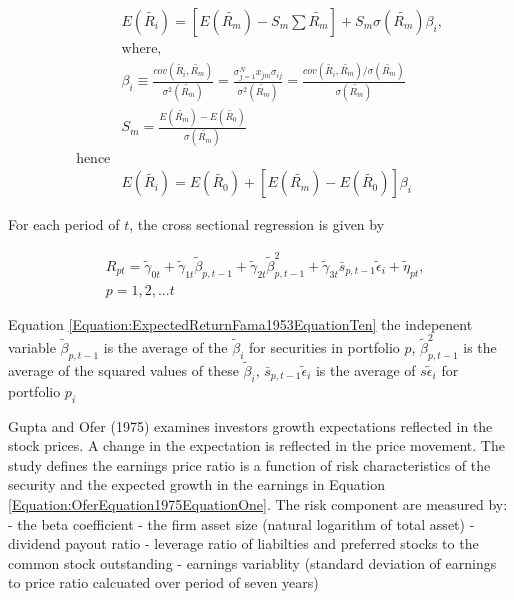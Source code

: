 \documentclass[
  letterpaper,
  DIV=11,
  numbers=noendperiod]{scrreprt}
\begin{document}
\begin{align}
    &E(\tilde{R_i}) = \left[E(\tilde{R_m}) -S_m \sum\tilde{R_m}  \right] + S_m \sigma (\tilde{R_m}) \beta_i, \nonumber \\
    &\text{where}, \nonumber \\ 
    &\beta_i \equiv \frac{cov(\tilde{R_i}, \tilde{R_m})}{\sigma^2(\tilde{R_m})} = \frac{\sigma_{j=1}^{N} x_{jm}\sigma_{ij}}{\sigma^2 (\tilde{R_m})}=\frac{cov(\tilde{R_i},\tilde{R_m})/\sigma(\tilde{R_m})}{\sigma (\tilde{R_m})} \nonumber \\
    &S_m=\frac{E(\tilde{R_m})-E(\tilde{R_0})}{\sigma (\tilde{R_m})}  \nonumber\\
    \text{hence} \nonumber \\
    &E(\tilde{R_i}) = E(\tilde{R_0}) + \left[ E(\tilde{R_m}) - E(\tilde{R_0}) \right] \beta_i
\end{align}
\label{Equation:ExpectedReturnFama1953}

For each period of \(t\), the cross sectional regression is given by

\begin{align}
    & R_{pt} = \tilde{\gamma}_{0t} + \tilde{\gamma}_{1t} \tilde{\beta}_{p,t-1}+\tilde{\gamma}_{2t} \tilde{\beta}_{p,t-1}^{2} + \tilde{\gamma}_{3t} \bar{s}_{p, t-1} \tilde{\epsilon}_{i}+\tilde{\eta}_{pt}, \\
    &p=1,2,...t \nonumber
\end{align}
\label{Equation:ExpectedReturnFama1953EquationTen}

Equation \ref{Equation:ExpectedReturnFama1953EquationTen} the indepenent
variable \(\tilde{\beta}_{p,t-1}\) is the average of the
\(\tilde{\beta}_i\) for securities in portfolio \(p\),
\(\tilde{\beta}_{p,t-1}^2\) is the average of the squared values of
these \(\tilde{\beta}_i\), \(\bar{s}_{p, t-1} \tilde{\epsilon}_{i}\) is
the average of \(s\tilde{\epsilon}_i\) for portfolio \(p_i\)

Gupta and Ofer (1975) examines investors growth expectations reflected
in the stock prices. A change in the expectation is reflected in the
price movement. The study defines the earnings price ratio is a function
of risk characteristics of the security and the expected growth in the
earnings in Equation \ref{Equation:OferEquation1975EquationOne}. The
risk component are measured by: - the beta coefficient - the firm asset
size (natural logarithm of total asset) - dividend payout ratio -
leverage ratio of liabilties and preferred stocks to the common stock
outstanding - earnings variablity (standard deviation of earnings to
price ratio calcuated over period of seven years)
\end{document}
